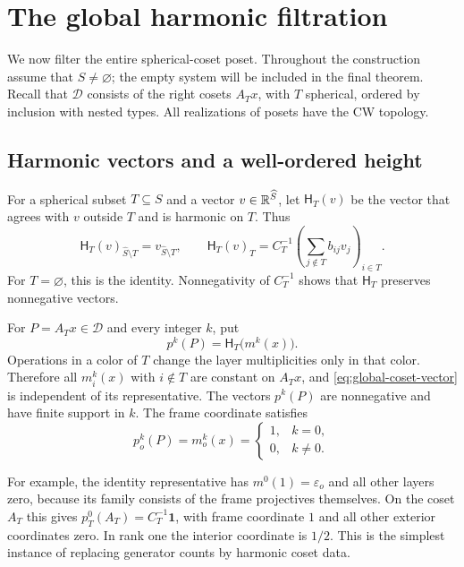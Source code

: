 \section{The global harmonic filtration}\label{sec:global}

We now filter the entire spherical-coset poset.  Throughout the construction
assume that $S\ne\varnothing$; the empty system will be included in the final
theorem.  Recall that $\mathcal D$ consists of the right cosets $A_Tx$, with
$T$ spherical, ordered by inclusion with nested types.  All realizations of
posets have the CW topology.

\subsection{Harmonic vectors and a well-ordered height}

For a spherical subset $T\subseteq S$ and a vector
$v\in\mathbb R^{\widehat S}$, let $\mathsf H_T(v)$ be the vector that agrees with
$v$ outside $T$ and is harmonic on $T$.  Thus
\begin{equation}\label{eq:global-harmonization}
 \mathsf H_T(v)_{\widehat S\setminus T}=v_{\widehat S\setminus T},
 \qquad
 \mathsf H_T(v)_T
   =C_T^{-1}\left(\sum_{j\notin T}b_{ij}v_j\right)_{i\in T}.
\end{equation}
For $T=\varnothing$, this is the identity.  Nonnegativity of $C_T^{-1}$
shows that $\mathsf H_T$ preserves nonnegative vectors.

For $P=A_Tx\in\mathcal D$ and every integer $k$, put
\begin{equation}\label{eq:global-coset-vector}
 p^k(P)=\mathsf H_T\bigl(m^k(x)\bigr).
\end{equation}
Operations in a color of $T$ change the layer multiplicities only in that
color.  Therefore all $m_i^k(x)$ with $i\notin T$ are constant on $A_Tx$,
and \eqref{eq:global-coset-vector} is independent of its representative.
The vectors $p^k(P)$ are nonnegative and have finite support in $k$.
The frame coordinate satisfies
\begin{equation}\label{eq:global-frame}
 p_o^k(P)=m_o^k(x)=
 \begin{cases}1,&k=0,\\0,&k\ne0.\end{cases}
\end{equation}

For example, the identity representative has $m^0(1)=\varepsilon_o$
and all other layers zero, because its family consists of the frame
projectives themselves.  On the coset $A_T$ this gives
$p_T^0(A_T)=C_T^{-1}\mathbf1$, with frame coordinate $1$ and all
other exterior coordinates zero.  In rank one the interior coordinate
is $1/2$.  This is the simplest instance of replacing generator counts
by harmonic coset data.


